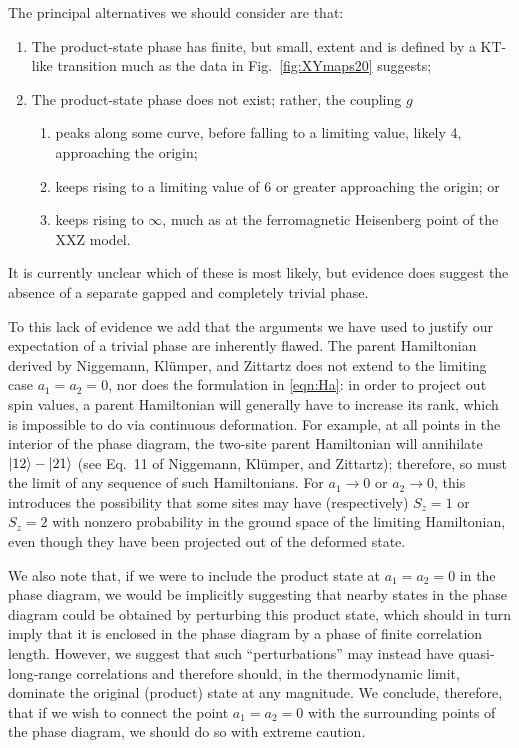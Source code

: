 \documentclass[aps,prb,letterpaper,superscriptaddress,twocolumn,showpacs,floatfix,10pt]{revtex4-1}
\begin{document}
The principal alternatives we should consider are that:
\begin{enumerate}
  \item The product-state phase has finite, but small, extent and is defined
  by a KT-like transition much as the data in Fig.~\ref{fig:XYmaps20} suggests;
  \item The product-state phase does not exist; rather, the coupling $g$
  \begin{enumerate}
    \item peaks along some curve, before falling to a limiting value,
    likely 4, approaching the origin;
    \item keeps rising to a limiting value of 6 or greater approaching the
    origin; or
    \item keeps rising to $\infty$, much as at the ferromagnetic Heisenberg
    point of the XXZ model.\cite{Fendley}
  \end{enumerate}
\end{enumerate}
It is currently unclear which of these is most likely, but evidence does suggest
the absence of a separate gapped and completely trivial phase.

To this lack of evidence we add that the arguments we have used to
justify our expectation of a trivial phase are inherently flawed.
The parent Hamiltonian\cite{NKZspin2} derived by Niggemann, Kl\"umper,
and Zittartz does not
extend to the limiting case $a_1=a_2=0$, nor does the formulation in
\eqref{eqn:Ha}: in order to project out spin values, a parent Hamiltonian
will generally have to increase its rank, which is impossible to do via
continuous deformation. For example, at all points in the interior of the
phase diagram, the two-site parent Hamiltonian will annihilate
$\vert12\rangle-\vert21\rangle$ (see Eq.~11 of Niggemann, Kl\"umper, and
Zittartz\cite{NKZspin2}); therefore, so must the limit of any sequence of
such Hamiltonians. For $a_1\to 0$ or $a_2\to 0$, this introduces the
possibility that
some sites may have (respectively) $S_z=1$ or $S_z=2$ with nonzero probability
in the ground space of the limiting Hamiltonian, even though they have been
projected out of the deformed
state.


We also note that, if we were to include the product state at $a_1=a_2=0$ in the
phase diagram, we would be implicitly suggesting that nearby states in
the phase diagram could be obtained by perturbing this product state, which
should in turn imply that it is enclosed in the phase diagram by a phase
of finite correlation length. However, we suggest that such ``perturbations''
may instead have quasi-long-range correlations and therefore should, in the
thermodynamic limit, dominate the original (product) state at any magnitude.
We conclude, therefore, that if we wish to connect the point $a_1=a_2=0$ with
the surrounding points of the phase diagram, we should do so with extreme
caution.
\end{document}
